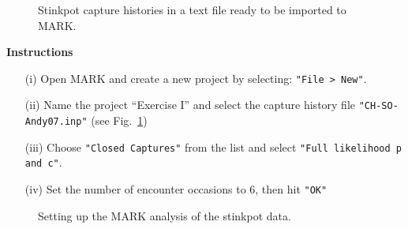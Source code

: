 \documentclass[12pt]{article}
\begin{document}
\begin{figure}[h!]
  \centering
  \caption{\small Stinkpot capture histories in a text file ready to
    be imported to MARK.}
  \label{fig:stink07-data}
\end{figure}

\clearpage

{\bf Instructions}
\begin{enumerate}
  \item[(i)] Open MARK and create a new project by selecting:
    \verb+"File > New"+.
  \item[(ii)] Name the project ``Exercise I'' and select the capture
    history file \verb+"CH-SO-Andy07.inp"+ (see
    Fig.~\ref{fig:stink07-data})
  \item[(iii)] Choose \verb+"Closed Captures"+ from the list and select
    \verb+"Full likelihood p and c"+.
  \item[(iv)] Set the number of encounter occasions to 6, then hit
    \verb+"OK"+
\end{enumerate}

\begin{figure}[h!]
  \centering
  \caption{\small Setting up the MARK analysis of the stinkpot data.}
  \label{fig:stink07-mark}
\end{figure}
\end{document}
